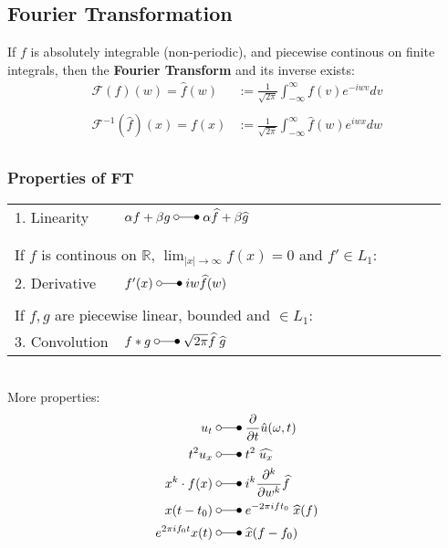 \subsection{Fourier Transformation}
If $f$ is absolutely integrable (non-periodic), and piecewise continous on finite integrals,
then the \textbf{Fourier Transform} and its inverse exists:
\begin{align*}
    \mathcal{F}(f)(w)=\widehat{f}(w)      & :=\frac1{\sqrt{2\pi}}\int_{-\infty}^{\infty}f(v)e^{-iwv}dv          \\\\
    \mathcal{F}^{-1}(\widehat{f})(x)=f(x) & :=\frac1{\sqrt{2\pi}}\int_{-\infty}^{\infty}\widehat{f}(w)e^{iwx}dw \\
\end{align*}
\subsubsection{Properties of FT}

\begin{tabular}[h]{p{0.25\linewidth} p{0.74\linewidth}}
    1. Linearity   & $\alpha f+\beta g\;\laplace\;\alpha\widehat{f}+\beta\widehat{g}$                                    \\
                   &                                                                                                     \\
                   &                                                                                                     \\
    \multicolumn{2}{p{0.9\linewidth}}{If $f$ is continous on $\mathbb{R}$, $\lim_{|x|\to\infty}f(x)=0$ and $f'\in L_1$:} \\
    2. Derivative  & $f^{\prime}(x)\;\laplace\;iw\widehat{f}(w)$                                                         \\
                   &                                                                                                     \\
    \multicolumn{2}{p{0.9\linewidth}}{If $f,g$ are piecewise linear, bounded and $\in L_1$:}                             \\
    3. Convolution & $f*g\;\laplace\;\sqrt{2\pi}\widehat{f}\;\widehat{g}$                                                \\
\end{tabular}\vspace*{8pt}\\
More properties:
\begin{align*}
    u_t                & \;\laplace\;\frac\partial{\partial t}\hat{u}(\omega,t)     \\
    t^2u_x             & \;\laplace\; t^2\;\widehat{u_x}                            \\
    x^k\cdot f(x)      & \;\laplace\;i^k \frac{\partial^k}{\partial w^k}\widehat{f} \\
    x(t-t_0)           & \;\laplace\; e^{-2\pi ift_0}\;\widehat{x}(f)               \\
    e^{2\pi if_0t}x(t) & \;\laplace\; \widehat{x}(f-f_0)
\end{align*}

